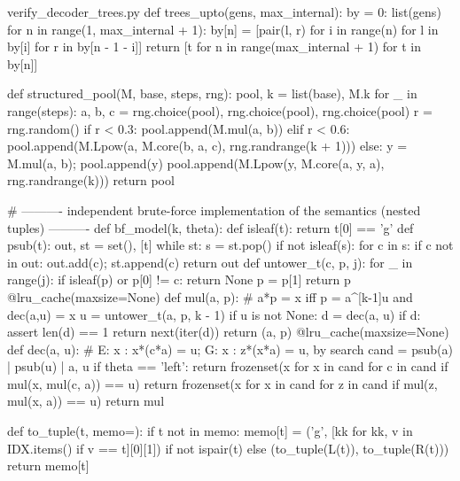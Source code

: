 \begin{filecontents*}[overwrite]{verify_decoder_trees.py}
def trees_upto(gens, max_internal):
    by = {0: list(gens)}
    for n in range(1, max_internal + 1):
        by[n] = [pair(l, r) for i in range(n) for l in by[i] for r in by[n - 1 - i]]
    return [t for n in range(max_internal + 1) for t in by[n]]

def structured_pool(M, base, steps, rng):
    pool, k = list(base), M.k
    for _ in range(steps):
        a, b, c = rng.choice(pool), rng.choice(pool), rng.choice(pool)
        r = rng.random()
        if r < 0.3: pool.append(M.mul(a, b))
        elif r < 0.6: pool.append(M.Lpow(a, M.core(b, a, c), rng.randrange(k + 1)))
        else:
            y = M.mul(a, b); pool.append(y)
            pool.append(M.Lpow(y, M.core(a, y, a), rng.randrange(k)))
    return pool

# ---------- independent brute-force implementation of the semantics (nested tuples) ----------
def bf_model(k, theta):
    def isleaf(t): return t[0] == 'g'
    def psub(t):
        out, st = set(), [t]
        while st:
            s = st.pop()
            if not isleaf(s):
                for c in s:
                    if c not in out: out.add(c); st.append(c)
        return out
    def untower_t(c, p, j):
        for _ in range(j):
            if isleaf(p) or p[0] != c: return None
            p = p[1]
        return p
    @lru_cache(maxsize=None)
    def mul(a, p):                       # a*p = x iff p = a^[k-1]u and dec(a,u) = {x}
        u = untower_t(a, p, k - 1)
        if u is not None:
            d = dec(a, u)
            if d:
                assert len(d) == 1
                return next(iter(d))
        return (a, p)
    @lru_cache(maxsize=None)
    def dec(a, u):                       # E: {x : x*(c*a) = u};  G: {x : z*(x*a) = u}, by search
        cand = psub(a) | psub(u) | {a, u}
        if theta == 'left':
            return frozenset(x for x in cand for c in cand if mul(x, mul(c, a)) == u)
        return frozenset(x for x in cand for z in cand if mul(z, mul(x, a)) == u)
    return mul

def to_tuple(t, memo={}):
    if t not in memo:
        memo[t] = ('g', [kk for kk, v in IDX.items() if v == t][0][1]) if not ispair(t) else (to_tuple(L(t)), to_tuple(R(t)))
    return memo[t]


\end{filecontents*}
